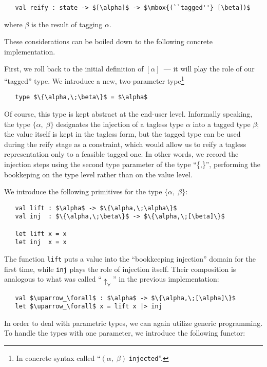 \begin{lstlisting}
   val reify : state -> $[\alpha]$ -> $\mbox{(``tagged''} [\beta])$
\end{lstlisting}

\noindent where $\beta$ is the result of tagging $\alpha$.

These considerations can be boiled down to the following concrete implementation.

First, we roll back to the initial definition of $[\alpha]$~--- it will play the role of our ``tagged'' type.
We introduce a new, two-parameter type\footnote{In concrete syntax called ``$(\alpha,\;\beta)\;$\lstinline{injected}''.}

\begin{lstlisting}
   type $\{\alpha,\;\beta\}$ = $\alpha$
\end{lstlisting}

Of course, this type is kept abstract at the end-user level. Informally speaking, the type $\{\alpha,\;\beta\}$ designates the
injection of a tagless type $\alpha$ into a tagged type $\beta$; the value itself is kept in the tagless form, but
the tagged type can be used during the reify stage as a constraint, which would allow us to reify a tagless
representation only to a feasible tagged one. In other words, we record the injection steps using the second
type parameter of the type ``\{,\}'', performing the bookkeping on the type level rather than on the value level.

We introduce the following primitives for the type $\{\alpha,\;\beta\}$:

\begin{lstlisting}
   val lift : $\alpha$ -> $\{\alpha,\;\alpha\}$
   val inj  : $\{\alpha,\;\beta\}$ -> $\{\alpha,\;[\beta]\}$

   let lift x = x
   let inj  x = x
\end{lstlisting}

The function \lstinline{lift} puts a value into the ``bookkeeping injection'' domain for the first time, while
\lstinline{inj} plays the role of injection itself. Their composition is analogous to what was
called ``$\uparrow_\forall$'' in the previous implementation:

\begin{lstlisting}
   val $\uparrow_\forall$ : $\alpha$ -> $\{\alpha,\;[\alpha]\}$
   let $\uparrow_\forall$ x = lift x |> inj
\end{lstlisting}

In order to deal with parametric types, we can again utilize generic programming. To handle the types with
one parameter, we introduce the following functor:

